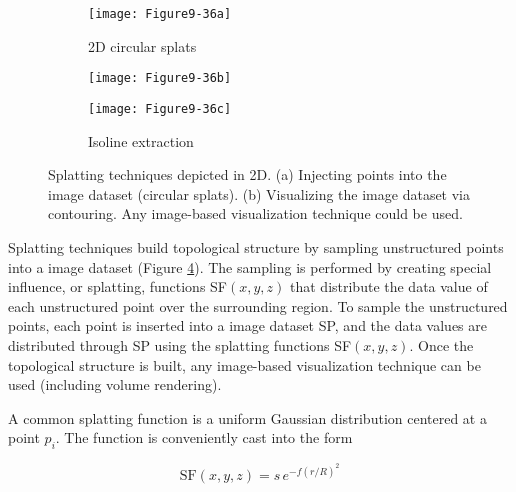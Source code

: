 \begin{description}[leftmargin=0cm,labelindent=0cm]

\item[Splatting Techniques.]
\label{subsec:visualizing_unstructured_points_splatting_techniques}

\begin{figure}[htb]
    \centering
	\begin{subfigure}[h]{0.36\linewidth}
		\texttt{[image: Figure9-36a]}
		\captionsetup{justification=centering}
		\caption{2D circular splats}
		\label{fig:Figure9-36a}
	\end{subfigure}
	\hfill
	\begin{subfigure}[h]{0.24\linewidth}
		\texttt{[image: Figure9-36b]}
		\captionsetup{justification=centering}
		\caption*{}
		\label{fig:Figure9-36b}
	\end{subfigure}
	\hfill
	\begin{subfigure}[h]{0.36\linewidth}
		\texttt{[image: Figure9-36c]}
		\captionsetup{justification=centering}
		\caption{Isoline extraction}
		\label{fig:Figure9-36c}
	\end{subfigure}
	\caption{Splatting techniques depicted in 2D. (a) Injecting points into the image dataset (circular splats). (b) Visualizing the image dataset via contouring. Any image-based visualization technique could be used.}\label{fig:Figure9-36}
\end{figure}


Splatting techniques build topological structure by sampling unstructured points into a image dataset (Figure \ref{fig:Figure9-36}). The sampling is performed by creating special influence, or splatting, functions SF$(x,y,z)$ that distribute the data value of each unstructured point over the surrounding region. To sample the unstructured points, each point is inserted into a image dataset SP, and the data values are distributed through SP using the splatting functions SF$(x,y,z)$. Once the topological structure is built, any image-based visualization technique can be used (including volume rendering).

A common splatting function is a uniform Gaussian distribution centered at a point $p_i$. The function is conveniently cast into the form

\begin{equation}\label{eq:9.22}
\text{SF}(x, y, z) = s\, e^{-f(r/R)^2}
\end{equation}


\end{description}
